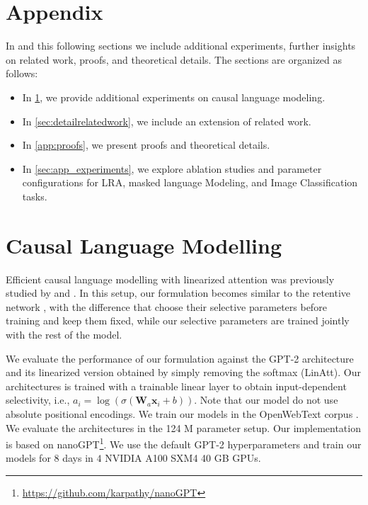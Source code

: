 
\appendix
\onecolumn

\section*{Appendix}

In and this following sections we include additional experiments, further insights on related work, proofs, and theoretical details. The sections are organized as follows:
\begin{itemize}
   \item In \cref{subsec:causal_lm}, we provide additional experiments on causal language modeling.
   \item In \cref{sec:detailrelatedwork}, we include an extension of related work.
   \item In \cref{app:proofs}, we present proofs and theoretical details.
   \item In \cref{sec:app_experiments}, we explore ablation studies and parameter configurations for LRA, masked language Modeling,  and Image Classification tasks.
\end{itemize}



\section{Causal Language Modelling}
\label{subsec:causal_lm}
Efficient causal language modelling with linearized attention was previously studied by \citet{trans_rnn} and \citet{retnet}. In this setup, our formulation becomes similar to the retentive network \citep{retnet}, with the difference that \citet{retnet} choose their selective parameters before training and keep them fixed, while our selective parameters  are trained jointly with the rest of the model. 

We evaluate the performance of our formulation against the GPT-2 architecture \citep{radford2019language} and its linearized version obtained by simply removing the softmax (LinAtt). Our architectures \lions{} is trained with a trainable linear layer to obtain input-dependent selectivity, i.e., $a_i = \log(\sigma(\mathbf{W}_{a}\mathbf{x}_i + b))$. Note that our model do not use absolute positional encodings. We train our models in the OpenWebText corpus \citep{Gokaslan2019OpenWeb}. We evaluate the architectures in the 124 M parameter setup. Our implementation is based on nanoGPT\footnote{\url{https://github.com/karpathy/nanoGPT}}. We use the default GPT-2 hyperparameters and train our models for $8$ days in $4$ NVIDIA A100 SXM4 40 GB GPUs.

